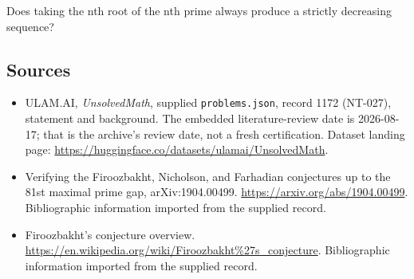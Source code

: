 \documentclass[11pt,a4paper]{article}
\begin{document}
Does taking the nth root of the nth prime always produce a strictly decreasing sequence?

\subsection{Sources}

{\small

\begin{itemize}

\item[\hypertarget{source:1172:1}{S1}] ULAM.AI, \emph{UnsolvedMath}, supplied \texttt{problems.json}, record 1172 (NT-027), statement and background. The embedded literature-review date is 2026-08-17; that is the archive’s review date, not a fresh certification. Dataset landing page: \url{https://huggingface.co/datasets/ulamai/UnsolvedMath}.

\item[\hypertarget{source:1172:2}{S2}] Verifying the Firoozbakht, Nicholson, and Farhadian conjectures up to the 81st maximal prime gap, arXiv:1904.00499. \url{https://arxiv.org/abs/1904.00499}. Bibliographic information imported from the supplied record.

\item[\hypertarget{source:1172:3}{S3}] Firoozbakht's conjecture overview. \url{https://en.wikipedia.org/wiki/Firoozbakht%27s_conjecture}. Bibliographic information imported from the supplied record.

\end{itemize}

}

\label{end:1172}
\end{document}
